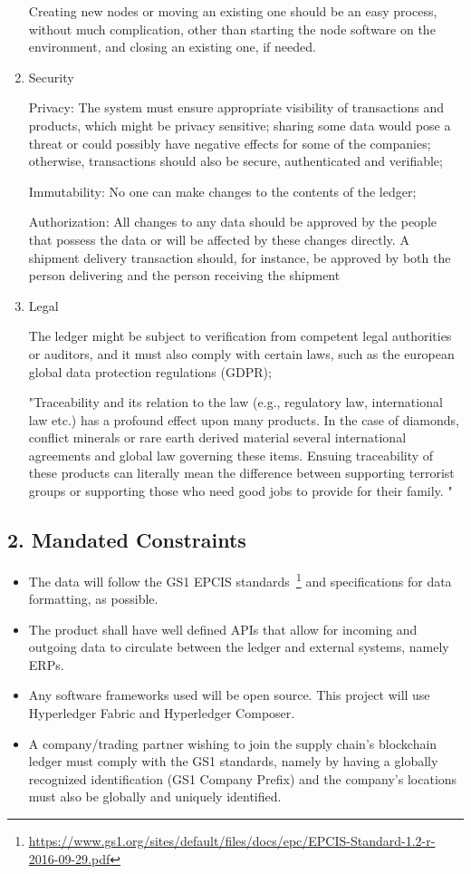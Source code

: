 \begin{enumerate}
		\par Creating new nodes or moving an existing one should be an easy process, without much complication, other than starting the node software on the environment, and closing an existing one, if needed.
    \item  Security
		\par Privacy: The system must ensure appropriate visibility of transactions and products, which might be privacy sensitive; sharing some data would pose a threat or could possibly have negative effects for some of the companies; otherwise, transactions should also be secure, authenticated and verifiable;
		\par Immutability: No one can make changes to the contents of the ledger;
		\par Authorization: All changes to any data should be approved by the people that possess the data or will be affected by these changes directly. A shipment delivery transaction should, for instance, be approved by both the person delivering and the person receiving the shipment
	\item  Legal
		\par The ledger might be subject to verification from competent legal authorities or auditors, and it must also comply with certain laws, such as the european global data protection regulations (GDPR);
		\par "Traceability and its relation to the law (e.g., regulatory law, international law etc.) has a profound effect upon many products. In the case of diamonds, conflict minerals or rare earth derived material several international agreements and global law governing these items. Ensuing traceability of these products can literally mean the difference between supporting terrorist groups or supporting those who need good jobs to provide for their family. "
		
\end{enumerate}


\subsection*{2. Mandated Constraints}
    \begin{itemize}
		\item The data will follow the GS1 EPCIS standards~\footnote{\url{https://www.gs1.org/sites/default/files/docs/epc/EPCIS-Standard-1.2-r-2016-09-29.pdf}} and specifications for data formatting, as possible.
		\item The product shall have well defined APIs that allow for incoming and outgoing data to circulate between the ledger and external systems, namely ERPs.
		\item Any software frameworks used will be open source. This project will use Hyperledger Fabric and Hyperledger Composer.
		\item A company/trading partner wishing to join the supply chain's blockchain ledger must comply with the GS1 standards, namely by having a globally recognized identification (GS1 Company Prefix) and the company's locations must also be globally and uniquely identified.
        \end{itemize}


